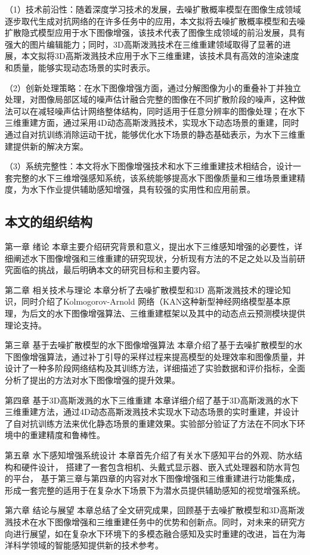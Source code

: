 （1）技术前沿性：随着深度学习技术的发展，去噪扩散概率模型在图像生成领域逐步取代生成对抗网络的在许多任务中的应用，本文拟将去噪扩散概率模型和去噪扩散隐式模型应用于水下图像增强，该技术代表了图像生成领域的前沿发展，具有强大的图片编辑能力；同时，3D高斯泼溅技术在三维重建领域取得了显著的进展，本文拟将3D高斯泼溅技术应用于水下三维重建，该技术具有高效的渲染速度和质量，能够实现动态场景的实时表示。

（2）创新处理策略：在水下图像增强方面，通过分解图像为小的重叠补丁并独立处理，对图像局部区域的噪声估计融合完整的图像在不同扩散阶段的噪声，这种做法可以在减轻噪声估计网络整体结构，同时适用于任意分辨率的图像处理；在水下三维重建方面，通过采用4D动态高斯泼溅技术，实现水下动态场景的重建，同时通过自对抗训练消除运动干扰，能够优化水下场景的静态基础表示，为水下三维重建提供新的解决方案。

（3）系统完整性：本文将水下图像增强技术和水下三维重建技术相结合，设计一套完整的水下三维增强感知系统，该系统能够提高水下图像质量和三维场景重建精度，为水下作业提供辅助感知增强，具有较强的实用性和应用前景。

\subsection{本文的组织结构}
第一章 绪论
本章主要介绍研究背景和意义，提出水下三维感知增强的必要性，详细阐述水下图像增强和三维重建的研究现状，分析现有方法的不足之处以及当前研究面临的挑战，最后明确本文的研究目标和主要内容。

第二章 相关技术与理论
本章分析了去噪扩散模型和3D 高斯泼溅技术的理论知识，同时介绍了Kolmogorov-Arnold 网络（KAN这种新型神经网络模型基本原理，为后文的水下图像增强算法、三维重建框架以及其中的动态点云预测模块提供理论支持。

第三章 基于去噪扩散模型的水下图像增强算法
本章介绍了基于去噪扩散模型的水下图像增强算法，通过补丁引导的采样过程来提高模型的处理效率和图像质量，并设计了一种多阶段网络结构及其训练方法，详细描述了实验数据和评价指标，全面分析了提出的方法对水下图像增强的提升效果。

第四章 基于3D高斯泼溅的水下三维重建
本章详细介绍了基于3D高斯泼溅的水下三维重建方法，通过4D动态高斯泼溅技术实现水下动态场景的实时重建，并设计了自对抗训练方法来优化静态场景的重建效果。实验部分验证了方法在不同水下环境中的重建精度和鲁棒性。

第五章 水下感知增强系统设计
本章首先介绍了有关水下感知平台的外观、防水结构和硬件设计，
搭建了一套包含相机、头戴式显示器、嵌入式处理器和防水背包的平台，
基于第三章与第四章的内容对水下图像增强和三维重建进行功能集成，
形成一套完整的适用于在复杂水下场景下为潜水员提供辅助感知的视觉增强系统。



第六章 结论与展望
本章总结了全文研究成果，回顾基于去噪扩散模型和3D高斯泼溅技术在水下图像增强和三维重建任务中的优势和创新点。同时，对未来的研究方向进行展望，如在复杂水下环境下的多模态融合感知及实时重建的改进，旨在为海洋科学领域的智能感知提供新的技术参考。
